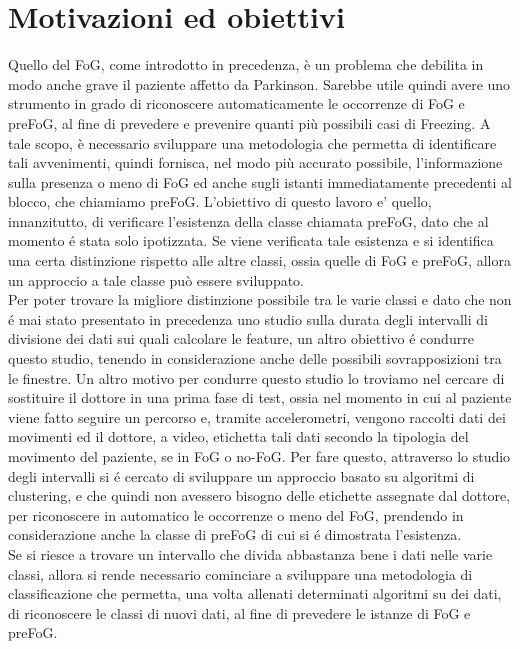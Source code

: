 


\chapter{Motivazioni ed obiettivi}\label{chap4:Goals}
Quello del FoG, come introdotto in precedenza, è un problema che debilita in modo anche grave il paziente affetto da Parkinson. Sarebbe utile quindi avere uno strumento in grado di riconoscere automaticamente le occorrenze di FoG e preFoG, al fine di prevedere e prevenire quanti più possibili casi di Freezing. A tale scopo, è necessario sviluppare una metodologia che permetta di identificare tali avvenimenti, quindi fornisca, nel modo più accurato possibile, l'informazione sulla presenza o meno di FoG ed anche sugli istanti immediatamente precedenti al blocco, che chiamiamo preFoG. L'obiettivo di questo lavoro e' quello, innanzitutto, di verificare l'esistenza della classe chiamata preFoG, dato che al momento é stata solo ipotizzata. Se viene verificata tale esistenza e si identifica una certa distinzione rispetto alle altre classi, ossia quelle di FoG e preFoG, allora un approccio a tale classe può essere sviluppato.\\
Per poter trovare la migliore distinzione possibile tra le varie classi e dato che non é mai stato presentato in precedenza uno studio sulla durata degli intervalli di divisione dei dati sui quali calcolare le feature, un altro obiettivo é condurre questo studio, tenendo in considerazione anche delle possibili sovrapposizioni tra le finestre. Un altro motivo per condurre questo studio lo troviamo nel cercare di sostituire il dottore in una prima fase di test, ossia nel momento in cui al paziente viene fatto seguire un percorso e, tramite accelerometri, vengono raccolti dati dei movimenti ed il dottore, a video, etichetta tali dati secondo la tipologia del movimento del paziente, se in FoG o no-FoG. Per fare questo, attraverso lo studio degli intervalli si é cercato di sviluppare un approccio basato su algoritmi di clustering, e che quindi non avessero bisogno delle etichette assegnate dal dottore, per riconoscere in automatico le occorrenze o meno del FoG, prendendo in considerazione anche la classe di preFoG di cui si é dimostrata l'esistenza.\\
Se si riesce a trovare un intervallo che divida abbastanza bene i dati nelle varie classi, allora si rende necessario cominciare a sviluppare una metodologia di classificazione che permetta, una volta allenati determinati algoritmi su dei dati, di riconoscere le classi di nuovi dati, al fine di prevedere le istanze di FoG e preFoG.\\
